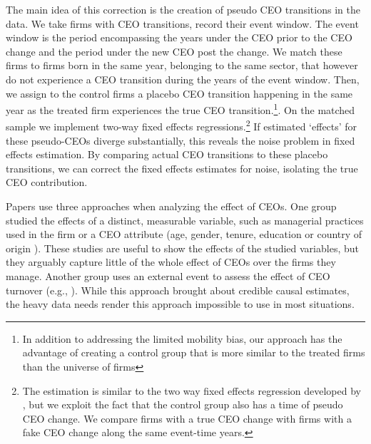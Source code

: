 \documentclass[11pt,a4paper]{article}
\begin{document}
The main idea of this correction is the creation of pseudo CEO transitions in the data. We take firms with CEO transitions, record their event window. The event window is the period encompassing the years under the CEO prior to the CEO change and the period under the new CEO post the change. We match these firms to firms born in the same year, belonging to the same sector, that however do not experience a CEO transition during the years of the event window. Then, we assign to the control firms a placebo CEO transition happening in the same year as the treated firm experiences the true CEO transition.\footnote{In addition to addressing the limited mobility bias, our approach has the advantage of creating a control group that is more similar to the treated firms than the universe of firms}. On the matched sample we implement two-way fixed effects regressions.\footnote{The estimation is similar to the two way fixed effects regression developed by \cite{Callaway2021JoLE}, but we exploit the fact that the control group also has a time of pseudo CEO change. We compare firms with a true CEO change with firms with a fake CEO change along the same event-time years.} If estimated `effects' for these pseudo-CEOs diverge substantially, this reveals the noise problem in fixed effects estimation. By comparing actual CEO transitions to these placebo transitions, we can correct the fixed effects estimates for noise, isolating the true CEO contribution.

Papers use three approaches when analyzing the effect of CEOs. One group studied the effects of a distinct, measurable variable, such as managerial practices used in the firm \citep{bloom2012organization} or a CEO attribute (age, gender, tenure, education or country of origin \citep{anderson2018pathways, henderson2006quickly, Koren2023expat}). These studies are useful to show the effects of the studied variables, but they arguably capture little of the whole effect of CEOs over the firms they manage. Another group uses an external event to assess the effect of CEO turnover (e.g., \citet{bennedsen2020ceos}). While this approach brought about credible causal estimates, the heavy data needs render this approach impossible to use in most situations. 
\end{document}

